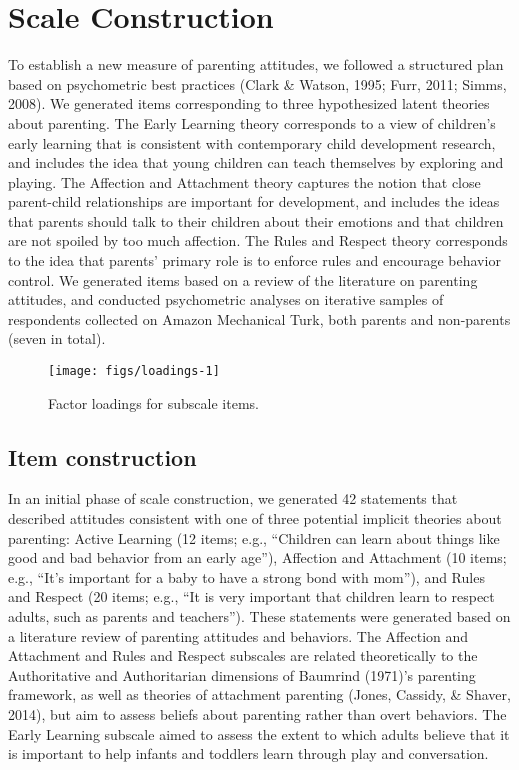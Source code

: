 \documentclass[10pt, letterpaper]{article}
\newenvironment{CodeChunk}{}{}
\begin{document}
\section{Scale Construction}\label{scale-construction}

To establish a new measure of parenting attitudes, we followed a
structured plan based on psychometric best practices (Clark \& Watson,
1995; Furr, 2011; Simms, 2008). We generated items corresponding to
three hypothesized latent theories about parenting. The Early Learning
theory corresponds to a view of children's early learning that is
consistent with contemporary child development research, and includes
the idea that young children can teach themselves by exploring and
playing. The Affection and Attachment theory captures the notion that
close parent-child relationships are important for development, and
includes the ideas that parents should talk to their children about
their emotions and that children are not spoiled by too much affection.
The Rules and Respect theory corresponds to the idea that parents'
primary role is to enforce rules and encourage behavior control. We
generated items based on a review of the literature on parenting
attitudes, and conducted psychometric analyses on iterative samples of
respondents collected on Amazon Mechanical Turk, both parents and
non-parents (seven in total).

\begin{CodeChunk}
\begin{figure*}

{\centering \texttt{[image: figs/loadings-1]} 

}

\caption[Factor loadings for subscale items]{Factor loadings for subscale items.}\label{fig:loadings}
\end{figure*}
\end{CodeChunk}

\subsection{Item construction}\label{item-construction}

In an initial phase of scale construction, we generated 42 statements
that described attitudes consistent with one of three potential implicit
theories about parenting: Active Learning (12 items; e.g., ``Children
can learn about things like good and bad behavior from an early age''),
Affection and Attachment (10 items; e.g., ``It's important for a baby to
have a strong bond with mom''), and Rules and Respect (20 items; e.g.,
``It is very important that children learn to respect adults, such as
parents and teachers''). These statements were generated based on a
literature review of parenting attitudes and behaviors. The Affection
and Attachment and Rules and Respect subscales are related theoretically
to the Authoritative and Authoritarian dimensions of Baumrind (1971)'s
parenting framework, as well as theories of attachment parenting (Jones,
Cassidy, \& Shaver, 2014), but aim to assess beliefs about parenting
rather than overt behaviors. The Early Learning subscale aimed to assess
the extent to which adults believe that it is important to help infants
and toddlers learn through play and conversation.
\end{document}

